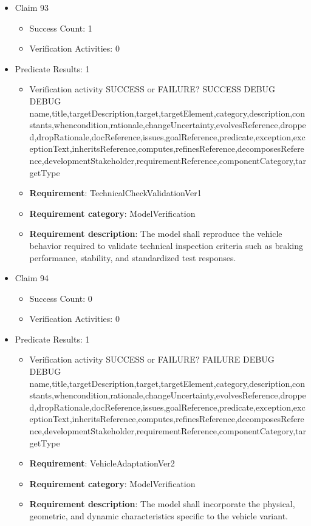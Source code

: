 \documentclass{article}
\begin{document}
\begin{itemize}
  				  \item Claim 93
				\begin{itemize}
			    	\item Success Count: 1 
			    	\item Verification Activities: 0
				\end{itemize}
				
									    
				\item Predicate Results: 1
					\begin{itemize}				
					\item Verification activity SUCCESS or FAILURE? SUCCESS
					DEBUG DEBUG name,title,targetDescription,target,targetElement,category,description,constants,whencondition,rationale,changeUncertainty,evolvesReference,dropped,dropRationale,docReference,issues,goalReference,predicate,exception,exceptionText,inheritsReference,computes,refinesReference,decomposesReference,developmentStakeholder,requirementReference,componentCategory,targetType
					\item \textbf{Requirement}: TechnicalCheckValidationVer1 
					\item \textbf{Requirement category}: ModelVerification
					\item \textbf{Requirement description}: The model shall reproduce the vehicle behavior required to validate technical inspection criteria such as braking performance, stability, and standardized test responses.
					\end{itemize}

  				  \item Claim 94
				\begin{itemize}
			    	\item Success Count: 0 
			    	\item Verification Activities: 0
				\end{itemize}
				
									    
				\item Predicate Results: 1
					\begin{itemize}				
					\item Verification activity SUCCESS or FAILURE? FAILURE
					DEBUG DEBUG name,title,targetDescription,target,targetElement,category,description,constants,whencondition,rationale,changeUncertainty,evolvesReference,dropped,dropRationale,docReference,issues,goalReference,predicate,exception,exceptionText,inheritsReference,computes,refinesReference,decomposesReference,developmentStakeholder,requirementReference,componentCategory,targetType
					\item \textbf{Requirement}: VehicleAdaptationVer2 
					\item \textbf{Requirement category}: ModelVerification
					\item \textbf{Requirement description}: The model shall incorporate the physical, geometric, and dynamic characteristics specific to the vehicle variant.
					\end{itemize}


\end{itemize}
\end{document}
